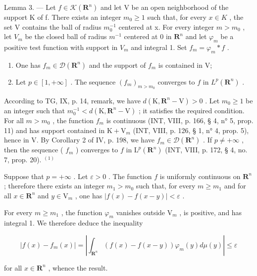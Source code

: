 Lemma 3. --- Let \(f \in \mathcal{K}(\mathbf{R}^n)\) and let V be an open neighborhood of the support K of f. There exists an integer \(m_0 \geqslant 1\) such that, for every \(x \in K\) , the set V contains the ball of radius \(m_0^{-1}\) centered at x. For every integer \(m > m_0\) , let \(V_m\) be the closed ball of radius \(m^{-1}\) centered at 0 in \(\mathbf{R}^{n}\) and let \(\varphi_{m}\) be a positive test function with support in \(V_{m}\) and integral 1. Set \(f_{m} = \varphi_{m} * f\) .

\begin{enumerate}
\def\labelenumi{\alph{enumi})}
\item
  One has \(f_{m}\in \mathcal{D}(\mathbf{R}^{n})\) and the support of \(f_{m}\) is contained in V;
\item
  Let \(p \in [1, +\infty]\) . The sequence \((f_m)_{m > m_0}\) converges to \(f\) in \(L^p(\mathbf{R}^n)\) .
\end{enumerate}

According to TG, IX, p. 14, remark, we have \(d(\mathrm{K}, \mathbf{R}^{n}-\mathrm{V}) > 0\) . Let \(m_{0} \geqslant 1\) be an integer such that \(m_{0}^{-1} < d(\mathrm{K}, \mathbf{R}^{n}-\mathrm{V})\) ; it satisfies the required condition. For all \(m > m_{0}\) , the function \(f_{m}\) is continuous (INT, VIII, p. 166, § 4, n° 5, prop. 11) and has support contained in \(\mathrm{K} + \mathrm{V}_{m}\) (INT, VIII, p. 126, § 1, n° 4, prop. 5), hence in V. By Corollary 2 of IV, p. 198, we have \(f_{m} \in \mathcal{D}(\mathbf{R}^{n})\) . If \(p \neq +\infty\) , then the sequence ( \(f_{m}\) ) converges to \(f\) in \(\mathrm{L}^{p}(\mathbf{R}^{n})\) (INT, VIII, p. 172, § 4, no. 7, prop. 20). \(^{(1)}\)

Suppose that \(p = +\infty\) . Let \(\varepsilon > 0\) . The function \(f\) is uniformly continuous on \(\mathbf{R}^n\) ; therefore there exists an integer \(m_1 > m_0\) such that, for every \(m \geqslant m_1\) and for all \(x \in \mathbf{R}^n\) and \(y \in \mathrm{V}_m\) , one has \(|f(x) - f(x - y)| < \varepsilon\) .

For every \(m \geqslant m_{1}\) , the function \(\varphi_{m}\) vanishes outside \(\mathrm{V}_{m}\) , is positive, and has integral 1. We therefore deduce the inequality

\[
| f (x) - f _ {m} (x) | = \left| \int_ {\mathbf {R} ^ {n}} (f (x) - f (x - y)) \varphi_ {m} (y) d \mu (y) \right| \leqslant \varepsilon
\]

for all \(x \in \mathbf{R}^{n}\) , whence the result.


